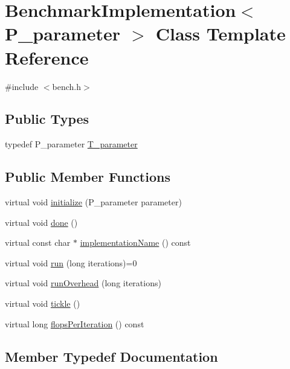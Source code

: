 \hypertarget{classBenchmarkImplementation}{}\section{Benchmark\+Implementation$<$ P\+\_\+parameter $>$ Class Template Reference}
\label{classBenchmarkImplementation}


{\ttfamily \#include $<$bench.\+h$>$}

\subsection*{Public Types}
\begin{DoxyCompactItemize}
\item 
typedef P\+\_\+parameter \hyperlink{classBenchmarkImplementation_ae7c0fcfe08fbde8c2d888a232b1e9e0a}{T\+\_\+parameter}
\end{DoxyCompactItemize}
\subsection*{Public Member Functions}
\begin{DoxyCompactItemize}
\item 
virtual void \hyperlink{classBenchmarkImplementation_ac9c73c683c0d17b98b3fe16ec9b16d58}{initialize} (P\+\_\+parameter parameter)
\item 
virtual void \hyperlink{classBenchmarkImplementation_a5f7c076ef08c8bf7e30bb86f87c41218}{done} ()
\item 
virtual const char $\ast$ \hyperlink{classBenchmarkImplementation_a1c59916a5fc3c6c89666aa8727ac2e01}{implementation\+Name} () const 
\item 
virtual void \hyperlink{classBenchmarkImplementation_af6493c5e944400854d490ba2c99b3a9a}{run} (long iterations)=0
\item 
virtual void \hyperlink{classBenchmarkImplementation_a6ef06b09acf4cc008a9d5fc62387ef13}{run\+Overhead} (long iterations)
\item 
virtual void \hyperlink{classBenchmarkImplementation_aa674f429dd0e135f34d79cc0dac6cd5e}{tickle} ()
\item 
virtual long \hyperlink{classBenchmarkImplementation_a86d27d304f1bb81a0867bbd50ef3fb05}{flops\+Per\+Iteration} () const 
\end{DoxyCompactItemize}


\subsection{Member Typedef Documentation}
\hypertarget{classBenchmarkImplementation_ae7c0fcfe08fbde8c2d888a232b1e9e0a}{}
